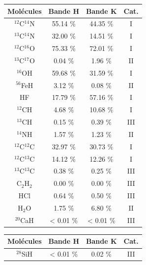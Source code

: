 \begin{table}[h!]
\vspace{0.3cm}
\begin{minipage}[t]{.4\linewidth}
\begin{center}
	\begin{tabular}{cccc}
        \hline
		\hline
        Molécules & Bande H & Bande K & Cat. \\
        \hline
        $^{12}$C$^{14}$N & 55.14 \% & 44.35 \% & I\\
        $^{13}$C$^{14}$N & 32.00 \%  & 14.51 \%& I \\
        $^{12}$C$^{16}$O & 75.33 \% & 72.01 \% & I\\
        $^{13}$C$^{17}$O & 0.04 \% & 1.96 \% & II\\
        $^{16}$OH & 59.68 \% & 31.59 \% & I\\
        $^{56}$FeH& 3.12 \% & 0.08 \% & II\\
        HF & 17.79 \%  & 57.16 \%  & I\\
        $^{12}$CH & 4.68 \% & 10.68 \% & I\\
        $^{13}$CH & 0.15 \% & 0.39 \% & III\\
        $^{14}$NH & 1.57 \% & 1.23 \% & II\\
        $^{12}$C$^{12}$C & 32.97 \% & 30.73 \%& I \\
        $^{12}$C$^{13}$C & 14.12 \% & 12.26 \% & I\\
        $^{13}$C$^{13}$C & 0.38 \% & 0.25 \% & III\\
        C$_2$H$_2$ &  0.00  \% & 0.00 \% & III\\
        HCl & 0.64 \% &  0.50 \% & III\\
		H$_2$O & 1.75 \% & 6.80 \% & II\\
        $^{20}$CaH & < 0.01  \% & < 0.01  \% & III\\
        \hline
    \end{tabular}
\end{center} 
\end{minipage} 
\hspace{2.cm}
\begin{minipage}[t]{.4\linewidth}
\begin{center}
   \begin{tabular}{cccc}
        \hline
		\hline
        Molécules & Bande H & Bande K & Cat. \\
        \hline
        $^{28}$SiH & < 0.01 \% & 0.02 \% & III\\

\end{tabular}
\end{center}
\end{minipage}
\end{table}
